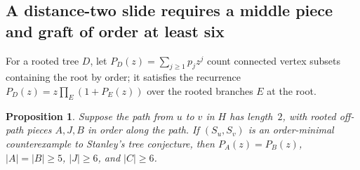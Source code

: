 \documentclass[10pt]{article}
\newtheorem{proposition}[theorem]{Proposition}
\begin{document}
\subsection{A distance-two slide requires a middle piece and graft of order at least six}

For a rooted tree $D$, let $P_D(z) = \sum_{j\ge 1} p_j z^j$ count connected vertex subsets containing the root by order; it satisfies the recurrence $P_D(z)=z\prod_E (1+P_E(z))$ over the rooted branches $E$ at the root.

\begin{proposition}\label{prop:dist2-six}
Suppose the path from $u$ to $v$ in $H$ has length~$2$, with rooted off-path pieces $A,J,B$ in order along the path. If $(S_u,S_v)$ is an order-minimal counterexample to Stanley's tree conjecture, then $P_A(z)=P_B(z)$, $|A|=|B|\ge 5$, $|J|\ge 6$, and $|C|\ge 6$.
\end{proposition}
\end{document}
